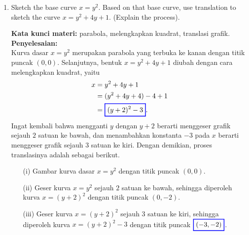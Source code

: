 \documentclass[10pt,openany,a4paper]{article}
\theoremstyle{definition}
\theoremstyle{definition}
\theoremstyle{plain}
\newenvironment{jawab}[2][tes]{%
\par\noindent\textbf{Kata kunci materi:} #1.\\
\textbf{Penyelesaian:} #2%
}{}
\begin{document}
\begin{enumerate}
\begin{jawab}[fungsi kontinu, limit, polinomial]
{\begin{enumerate}
\begin{align*}
        \end{align*}
        Berdasarkan hasil dari (a), diperoleh bahwa \(f(x)\) kontinu di \(x=2\) jika \(k=3\), yaitu $f(2)=6$, yang sama dengan nilai polinomial di atas saat $x=2$. Dengan demikian, fungsi \(f(x)\) dapat dinyatakan sebagai polinomial
        \begin{align*}
            \colorlet{oldcolor}{.}
        \color{red}
        \setlength{\fboxrule}{1pt} \boxed{\color{oldcolor}f(x) = \frac{1}{2}x^2 + x + 2}\color{oldcolor}.
        \end{align*}
        \end{enumerate}
    }
    \end{jawab}

    \item Sketch the base curve \(x = y^2\). Based on that base curve, use translation to sketch the curve \(x = y^2 + 4y + 1\). (Explain the process).
    \begin{jawab}[parabola, melengkapkan kuadrat, translasi grafik]{~\\
        Kurva dasar $x=y^2$ merupakan parabola yang terbuka ke kanan dengan titik puncak $(0,0)$. Selanjutnya, bentuk $x = y^2 + 4y + 1$ diubah dengan cara melengkapkan kuadrat, yaitu
        \begin{align*}
            x &= y^2 + 4y + 1\\
            &= (y^2 + 4y + 4) - 4 + 1\\
            &= \colorlet{oldcolor}{.}
        \color{blue}
        \setlength{\fboxrule}{1pt} \boxed{\color{oldcolor}(y+2)^2 - 3}\color{oldcolor}.
        \end{align*}
        Ingat kembali bahwa mengganti $y$ dengan $y+2$ berarti menggeser grafik sejauh $2$ satuan ke bawah, dan menambahkan konstanta $-3$ pada $x$ berarti menggeser grafik sejauh $3$ satuan ke kiri. Dengan demikian, proses translasinya adalah sebagai berikut.
        \begin{enumerate}
            \item[(i)] Gambar kurva dasar $x=y^2$ dengan titik puncak $(0,0)$.
            \item[(ii)] Geser kurva $x=y^2$ sejauh $2$ satuan ke bawah, sehingga diperoleh kurva $x=(y+2)^2$ dengan titik puncak $(0,-2)$.
            \item[(iii)] Geser kurva $x=(y+2)^2$ sejauh $3$ satuan ke kiri, sehingga diperoleh kurva $x=(y+2)^2-3$ dengan titik puncak $\colorlet{oldcolor}{.}
        \color{blue}
        \setlength{\fboxrule}{1pt} \boxed{\color{oldcolor}(-3,-2)}\color{oldcolor}$.

\end{enumerate}}
\end{jawab}
\end{enumerate}
\end{document}
